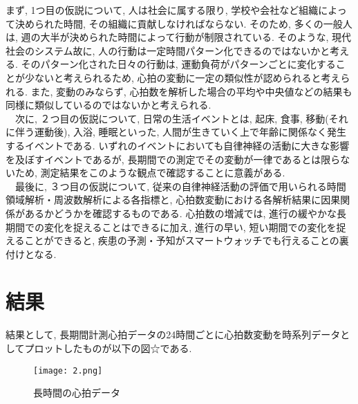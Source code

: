 \documentclass[report, 11pt, a4paper]{jsbook}
\begin{document}
まず, 1つ目の仮説について, 人は社会に属する限り, 学校や会社など組織によって決められた時間, その組織に貢献しなければならない. そのため, 多くの一般人は, 週の大半が決められた時間によって行動が制限されている. そのような, 現代社会のシステム故に, 人の行動は一定時間パターン化できるのではないかと考える. そのパターン化された日々の行動は, 運動負荷がパターンごとに変化することが少ないと考えられるため, 心拍の変動に一定の類似性が認められると考えられる. また, 変動のみならず, 心拍数を解析した場合の平均や中央値などの結果も同様に類似しているのではないかと考えられる. \\
　次に, ２つ目の仮説について, 日常の生活イベントとは, 起床, 食事, 移動(それに伴う運動後), 入浴, 睡眠といった, 人間が生きていく上で年齢に関係なく発生するイベントである. いずれのイベントにおいても自律神経の活動に大きな影響を及ぼすイベントであるが, 長期間での測定でその変動が一律であるとは限らないため, 測定結果をこのような観点で確認することに意義がある. \\
　最後に, ３つ目の仮説について, 従来の自律神経活動の評価で用いられる時間領域解析・周波数解析による各指標と, 心拍数変動における各解析結果に因果関係があるかどうかを確認するものである. 心拍数の増減では, 進行の緩やかな長期間での変化を捉えることはできるに加え, 進行の早い, 短い期間での変化を捉えることができると, 疾患の予測・予知がスマートウォッチでも行えることの裏付けとなる. 
　
\section{結果}
結果として, 長期間計測心拍データの24時間ごとに心拍数変動を時系列データとしてプロットしたものが以下の図☆である. 
 
\begin{figure}[!h]
\centering
\texttt{[image: 2.png]}
\caption{長時間の心拍データ}
\label{fig:goolge_trends}
\end{figure}
\end{document}
